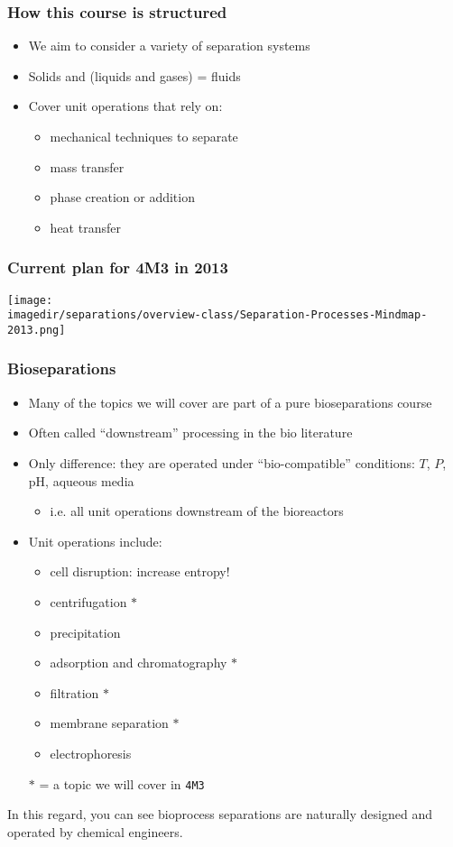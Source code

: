 \begin{frame}\frametitle{How this course is structured}
	\begin{itemize}
		\item	We aim to consider a variety of separation systems
		\item	Solids and (liquids and gases) = fluids
		\item	Cover unit operations that rely on:
		\begin{itemize}
			\item	mechanical techniques to separate
			\item	mass transfer
			\item	phase creation or addition
			\item	heat transfer
		\end{itemize}
	\end{itemize}
\end{frame}

\begin{frame}\frametitle{Current plan for 4M3 in 2013}
	\begin{center}
		\texttt{[image: \\imagedir/separations/overview-class/Separation-Processes-Mindmap-2013.png]}
	\end{center}
\end{frame}

\begin{frame}\frametitle{Bioseparations}
	\begin{itemize}
		\item	Many of the topics we will cover are part of a pure bioseparations course
		\item	Often called ``downstream'' processing in the bio literature
		\item	Only difference: they are operated under ``bio-compatible'' conditions: $T$, $P$, pH, aqueous media
		\begin{itemize}
			\item	i.e. all unit operations downstream of the bioreactors
		\end{itemize}
		\item	Unit operations include:
		\begin{itemize}
			\item	cell disruption: increase entropy!
			\item	centrifugation $\ast$
			\item	precipitation
			\item	adsorption and chromatography $\ast$
			\item	filtration $\ast$
			\item	membrane separation $\ast$
			\item	electrophoresis
		\end{itemize}
		\vspace{12pt}
		$\ast$ = a topic we will cover in \texttt{4M3}
	\end{itemize}
	\vspace{12pt}
	In this regard, you can see bioprocess separations are naturally designed and operated by chemical engineers.
\end{frame}

